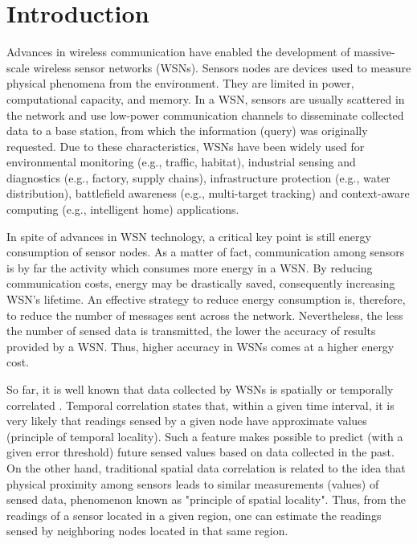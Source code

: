 \documentclass{acm_proc_article-sp}
\begin{document}
\section{Introduction}

Advances in wireless communication have enabled the development of massive-scale
wireless sensor networks (WSNs). Sensors nodes are devices used to measure
physical phenomena from the environment. They are limited in power,
computational capacity, and memory. In a WSN, sensors are usually scattered in
the network and use low-power communication channels to disseminate collected
data to a base station, from which the information (query) was originally
requested. Due to these characteristics, WSNs have been widely used for
environmental monitoring (e.g., traffic, habitat), industrial sensing and
diagnostics (e.g., factory, supply chains), infrastructure protection (e.g.,
water distribution), battlefield awareness (e.g., multi-target tracking) and
context-aware computing (e.g., intelligent home) applications.
\vspace*{-.3cm}

In spite of advances in WSN technology, a critical key point is still 
energy consumption of sensor nodes. As a matter of fact, communication among
sensors is by far the activity which consumes more energy in a WSN. By
reducing communication costs, energy may be drastically saved, consequently
increasing WSN's lifetime. An effective strategy to reduce energy
consumption is, therefore, to reduce the number of messages sent
across the network. Nevertheless, the less the number of sensed data is transmitted,
the lower the accuracy of results provided by a WSN. Thus, higher accuracy in
WSNs comes at a higher energy cost.
\vspace*{-.3cm}

So far, it is well known that data collected by WSNs is spatially or temporally 
correlated \cite{Chu2006, Villas2012, Yoon2005}. Temporal correlation states 
that, within a given time interval, it is very likely that readings sensed by a 
given node have approximate values (principle of temporal locality). Such a feature
makes possible to predict (with a given error threshold) future sensed values 
based on data collected in the past. On the other hand, traditional
spatial data correlation is related to the idea that physical proximity
among sensors leads to similar measurements (values) of sensed data, phenomenon
known as "principle of spatial locality". Thus, from the readings of a sensor 
located in a given region, one can estimate the readings sensed by neighboring 
nodes located in that same region.
\vspace*{-.3cm}
\end{document}
